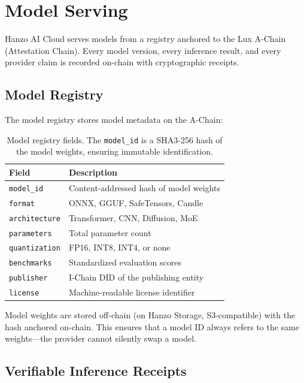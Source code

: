 \documentclass[11pt]{article}
\begin{document}
\section{Model Serving}
\label{sec:serving}

Hanzo AI Cloud serves models from a registry anchored to the Lux A-Chain
(Attestation Chain). Every model version, every inference result, and every
provider claim is recorded on-chain with cryptographic receipts.

\subsection{Model Registry}

The model registry stores model metadata on the A-Chain:

\begin{table}[H]
\centering
\small
\begin{tabular}{lp{6cm}}
\toprule
\textbf{Field} & \textbf{Description} \\
\midrule
\texttt{model\_id} & Content-addressed hash of model weights \\
\texttt{format} & ONNX, GGUF, SafeTensors, Candle \\
\texttt{architecture} & Transformer, CNN, Diffusion, MoE \\
\texttt{parameters} & Total parameter count \\
\texttt{quantization} & FP16, INT8, INT4, or none \\
\texttt{benchmarks} & Standardized evaluation scores \\
\texttt{publisher} & I-Chain DID of the publishing entity \\
\texttt{license} & Machine-readable license identifier \\
\bottomrule
\end{tabular}
\caption{Model registry fields. The \texttt{model\_id} is a SHA3-256 hash of
the model weights, ensuring immutable identification.}
\label{tab:registry}
\end{table}

Model weights are stored off-chain (on Hanzo Storage, S3-compatible) with the
hash anchored on-chain. This ensures that a model ID always refers to the same
weights---the provider cannot silently swap a model.

\subsection{Verifiable Inference Receipts}
\end{document}
